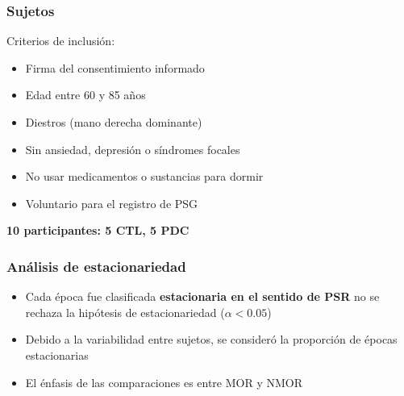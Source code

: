 \documentclass[serif,mathserif,professionalfont]{beamer}
\begin{document}
\begin{frame}\frametitle{Sujetos}
Criterios de inclusi\'on:
\begin{itemize}
\item Firma del consentimiento informado
\item Edad entre 60 y 85 a\~nos
\item Diestros (mano derecha dominante)
\item Sin ansiedad, depresi\'on o s\'indromes focales
\item No usar medicamentos o sustancias para dormir
\item Voluntario para el registro de PSG
\end{itemize}

\textbf{10 participantes: 5 CTL, 5 PDC}
\end{frame}





\begin{frame}\frametitle{Análisis de estacionariedad}
\begin{itemize}
\item Cada \'epoca fue clasificada \textbf{estacionaria en el sentido de PSR} 
no se rechaza la hip\'otesis de 
estacionariedad ($\alpha < 0.05$)

\item Debido a la variabilidad entre sujetos, se consider\'o la proporci\'on de \'epocas 
estacionarias

\item El énfasis de las comparaciones es entre MOR y NMOR
\end{itemize}
\end{frame}

\end{document}
